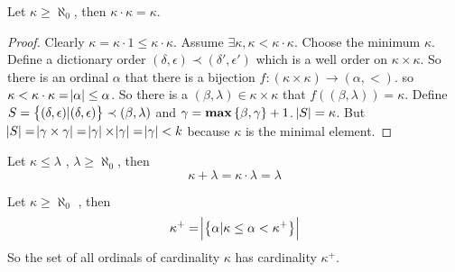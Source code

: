 \begin{theorem}
    Let $\kappa \geq \aleph_0$, then $\kappa \cdot \kappa = \kappa$.
\end{theorem}
\begin{proof}
    Clearly $\kappa = \kappa \cdot 1 \leq \kappa \cdot \kappa$. Assume $\exists \kappa, \kappa < \kappa \cdot \kappa$. Choose the minimum $\kappa$. Define a dictionary order $(\delta, \epsilon) \prec (\delta', \epsilon')$ which is a well order on $\kappa \times \kappa$. So there is an ordinal $\alpha$ that there is a bijection $f: (\kappa \times \kappa) \rightarrow (\alpha, <)$. so $\kappa < \kappa \cdot \kappa = \abs{\alpha} \leq \alpha$. So there is a $(\beta, \lambda) \in \kappa \times \kappa$ that $f((\beta, \lambda)) = \kappa$. Define $S = \set{(\delta, \epsilon)|(\delta, \epsilon) }\prec (\beta, \lambda)$ and $\gamma = \mathbf{max} \set{\beta, \gamma} + 1$. $\abs{S} = \kappa$. But $\abs{S} = \abs{\gamma \times \gamma} = \abs{\gamma} \times \abs{\gamma} = \abs{\gamma} < k$ because $\kappa$ is the minimal element. 
    

\end{proof}


\begin{theorem}
    Let $\kappa \leq \lambda$    , $\lambda \geq \aleph_0$, then
    \begin{equation}
        \kappa + \lambda = \kappa \cdot \lambda = \lambda
    \end{equation}
\end{theorem}

\begin{theorem}
    Let $\kappa \geq \aleph_0$    , then
    \begin{equation}
        \kappa^{+} = \abs{\set{\alpha | \kappa \leq \alpha < \kappa^{+}}}
    \end{equation}
    So the set of all ordinals of cardinality $\kappa$ has cardinality $\kappa^{+}$.
\end{theorem}















